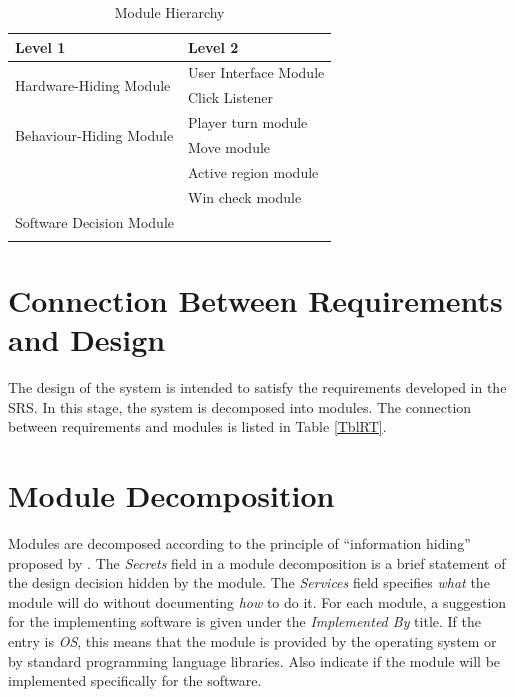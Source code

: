 \documentclass[12pt, titlepage]{article}
\begin{document}
\begin{table}[hp]
\centering
\begin{tabular}{p{} p{}}
\toprule
\textbf{Level 1} & \textbf{Level 2}\\
\midrule

\multirow{2}{0.3\textwidth}{Hardware-Hiding Module} & User Interface Module \\
& Click Listener \\
\midrule

\multirow{2}{0.3\textwidth}{Behaviour-Hiding Module} & Player turn module\\
& Move module\\
& Active region module\\
& Win check module\\
\midrule

\multirow{1}{0.3\textwidth}{Software Decision Module} & { }\\
& \\
\bottomrule

\end{tabular}
\caption{Module Hierarchy}
\label{TblMH}
\end{table}


\section{Connection Between Requirements and Design} \label{SecConnection}
The design of the system is intended to satisfy the requirements developed in
the SRS. In this stage, the system is decomposed into modules. The connection
between requirements and modules is listed in Table \ref{TblRT}.

\section{Module Decomposition} \label{SecMD}

Modules are decomposed according to the principle of ``information hiding''
proposed by \citet{ParnasEtAl1984}. The \emph{Secrets} field in a module
decomposition is a brief statement of the design decision hidden by the
module. The \emph{Services} field specifies \emph{what} the module will do
without documenting \emph{how} to do it. For each module, a suggestion for the
implementing software is given under the \emph{Implemented By} title. If the
entry is \emph{OS}, this means that the module is provided by the operating
system or by standard programming language libraries.  Also indicate if the
module will be implemented specifically for the software.
\end{document}
